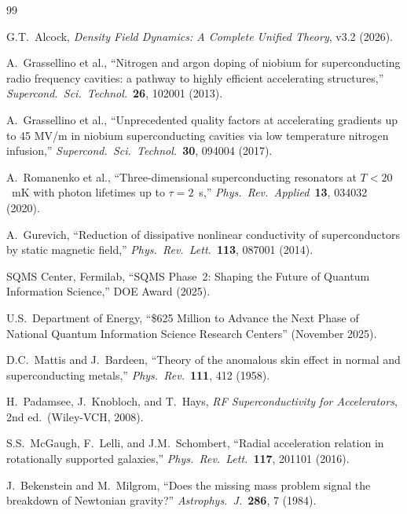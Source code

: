 \documentclass[11pt]{article}
\begin{document}
\newpage
\begin{thebibliography}{99}

G.T.~Alcock, \textit{Density Field Dynamics: A Complete Unified Theory},
v3.2 (2026).

A.~Grassellino et al.,
``Nitrogen and argon doping of niobium for superconducting radio
frequency cavities: a pathway to highly efficient accelerating structures,''
\textit{Supercond.\ Sci.\ Technol.}\ \textbf{26}, 102001 (2013).

A.~Grassellino et al.,
``Unprecedented quality factors at accelerating gradients up to 45 MV/m
in niobium superconducting cavities via low temperature nitrogen infusion,''
\textit{Supercond.\ Sci.\ Technol.}\ \textbf{30}, 094004 (2017).

A.~Romanenko et al.,
``Three-dimensional superconducting resonators at $T < 20$~mK with
photon lifetimes up to $\tau = 2$~s,''
\textit{Phys.\ Rev.\ Applied}\ \textbf{13}, 034032 (2020).

A.~Gurevich,
``Reduction of dissipative nonlinear conductivity of superconductors by
static magnetic field,''
\textit{Phys.\ Rev.\ Lett.}\ \textbf{113}, 087001 (2014).

SQMS Center, Fermilab,
``SQMS Phase~2: Shaping the Future of Quantum Information Science,''
DOE Award (2025).

U.S.\ Department of Energy,
``\$625 Million to Advance the Next Phase of National Quantum Information
Science Research Centers'' (November 2025).

D.C.~Mattis and J.~Bardeen,
``Theory of the anomalous skin effect in normal and superconducting metals,''
\textit{Phys.\ Rev.}\ \textbf{111}, 412 (1958).

H.~Padamsee, J.~Knobloch, and T.~Hays,
\textit{RF Superconductivity for Accelerators}, 2nd ed.\
(Wiley-VCH, 2008).

S.S.~McGaugh, F.~Lelli, and J.M.~Schombert,
``Radial acceleration relation in rotationally supported galaxies,''
\textit{Phys.\ Rev.\ Lett.}\ \textbf{117}, 201101 (2016).

J.~Bekenstein and M.~Milgrom,
``Does the missing mass problem signal the breakdown of Newtonian gravity?''
\textit{Astrophys.\ J.}\ \textbf{286}, 7 (1984).

\end{thebibliography}
\end{document}
